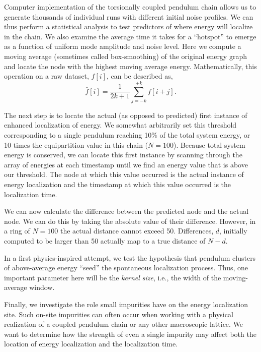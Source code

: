 \documentclass[11pt]{article}
\begin{document}
Computer implementation of the torsionally coupled pendulum chain allows us to generate thousands of individual runs with different initial noise profiles. We can thus perform a statistical analysis to test predictors of where energy will localize in the chain. We also examine the average time it takes for a ``hotspot'' to emerge as a function of uniform mode amplitude and noise level. Here we compute a moving average (sometimes called box-smoothing) of the original energy graph and locate the node with the highest moving average energy.
Mathematically, this operation on a raw dataset, $f[i]$, can be described as,
\begin{equation}
    \bar{f}[i]=\frac{1}{2k+1}\sum_{j=-k}^{+k} f[i+j].
\end{equation}


The next step is to locate the actual (as opposed to predicted) first instance of enhanced localization of energy. We somewhat arbitrarily set this threshold corresponding to a single pendulum reaching 10\% of the total system energy, or 10 times the equipartition value in this chain ($N=100$). Because total system energy is conserved, we can locate this first instance by scanning through the array of energies at each timestamp until we find an energy value that is above our threshold. The node at which this value occurred is the actual instance of energy localization and the timestamp at which this value occurred is the localization time.

We can now calculate the difference between the predicted node and the actual node. We can do this by taking the absolute value of their difference. However, in a ring of $N=100$ the actual distance cannot exceed 50. Differences, $d$, initially computed to be larger than 50 actually map to a true distance of $N-d$.

 
In a first physics-inspired attempt,
we test the hypothesis that pendulum clusters of above-average energy ``seed'' the spontaneous localization process. Thus, one important parameter here will be  the {\it kernel size}, i.e., the width of the moving-average window. 

Finally, we investigate the role small impurities have on the energy localization site. Such on-site impurities can often occur when working with a physical realization of a coupled pendulum chain or any other macroscopic lattice. We want to determine how the strength of even a single impurity may affect both the location of energy localization and the localization time.
\end{document}
